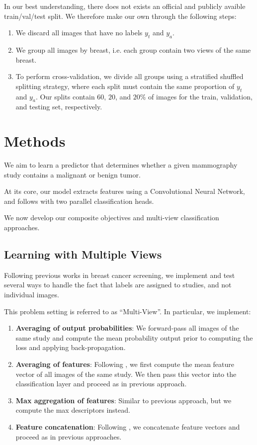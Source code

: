 \documentclass[11pt]{article}
\begin{document}
In our best understanding, there does not exists an official and publicly avaible train/val/test
split. We therefore make our own through the following steps:

\begin{enumerate}
\item We discard all images that have no labels \(y_t\) and \(y_a\).
\item We group all images by breast, i.e. each group contain two views of the same breast.
\item To perform cross-validation, we divide all groups using a stratified
shuffled splitting strategy, where each split
must contain the same proportion of \(y_t\) and \(y_a\). Our splits contain \(60\), \(20\),
 and \(20\%\) of images for the train, validation, and testing set, respectively.
\end{enumerate}

\section{Methods}
\label{sec:org922a1f7}

We aim to learn a predictor that determines whether a given mammography study
contains a malignant or benign tumor.

At its core, our model extracts features using a Convolutional Neural Network,
and follows with two parallel classification heads.

We now develop our composite objectives and multi-view classification approaches.

\subsection{\label{multiview}Learning with Multiple Views}
\label{sec:org0604f7c}

Following previous works in breast cancer screening,
we implement and test several ways to handle the fact that
labels are assigned to studies, and not individual images.

This problem setting is referred to as ``Multi-View''.
In particular, we implement:

\begin{enumerate}
\item \textbf{Averaging of output probabilities}:  We forward-pass all images of the same study
and compute the mean probability output prior to computing the loss and applying
back-propagation.
\item \textbf{Averaging of features}: Following \autocite{geras17} \autocite{seeland21}, we first compute the mean feature vector of all images of the same
study. We then pass this vector into the classification layer and proceed as in
previous approach.
\item \textbf{Max aggregation of features}: Similar to previous approach, but we compute the max descriptors instead.
\item \textbf{Feature concatenation}: Following \autocite{wu19} \autocite{chen22}, we concatenate feature
vectors and proceed as in previous approaches.
\end{enumerate}
\end{document}
